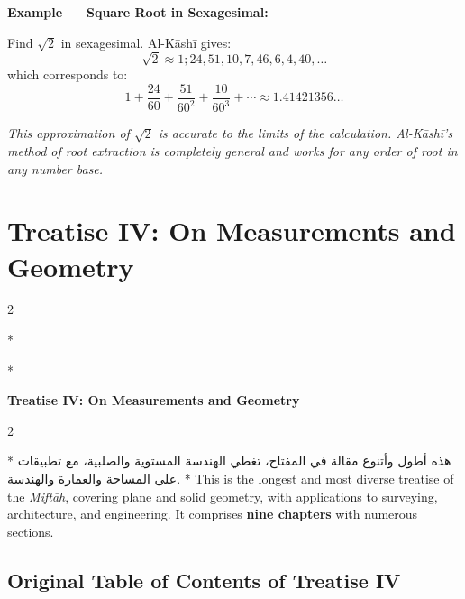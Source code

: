 \documentclass[11pt,a4paper]{article}
\newcommand{\cnote}[1]{\textcolor{notecolor}{\textit{#1}}}
\newcommand{\ar}[1]{{\arabicfont\beginR #1\endR}}
\newenvironment{bilingual}{%
  \vspace{0.3em}%
  \begin{paracol}{2}%
}{%
  \end{paracol}%
  \vspace{0.3em}%
}
\begin{document}
\noindent\textbf{Example --- Square Root in Sexagesimal:}

Find $\sqrt{2}$ in sexagesimal. Al-K\=ash\=i gives:
\[
\sqrt{2} \approx 1; 24, 51, 10, 7, 46, 6, 4, 40, \ldots
\]
which corresponds to:
\[
1 + \frac{24}{60} + \frac{51}{60^2} + \frac{10}{60^3} + \cdots \approx
1.41421356\ldots
\]

\cnote{This approximation of $\sqrt{2}$ is accurate to the limits of
the calculation. Al-K\=ash\=i's method of root extraction is completely
general and works for any order of root in any number base.}
\clearpage

\section{Treatise IV: On Measurements and Geometry}
\label{sec:treatise4}

\begin{bilingual}
\switchcolumn[0]*
\begin{center}
\textbf{\Large\color{chapcolor}\ar{المقالة الرابعة في حساب المساحات والأحجام}}
\end{center}
\switchcolumn[1]*
\begin{center}
\textbf{\Large\color{chapcolor}Treatise IV: On Measurements and Geometry}
\end{center}
\end{bilingual}

\begin{bilingual}
\switchcolumn[0]*
\ar{هذه أطول وأتنوع مقالة في المفتاح، تغطي الهندسة المستوية والصلبية، مع تطبيقات على المساحة والعمارة والهندسة.}
\switchcolumn[1]*
This is the longest and most diverse treatise of the
\textit{Mift\=ah}, covering plane and solid geometry, with applications to
surveying, architecture, and engineering. It comprises \textbf{nine
chapters} with numerous sections.
\end{bilingual}

\subsection{Original Table of Contents of Treatise IV}
\end{document}
